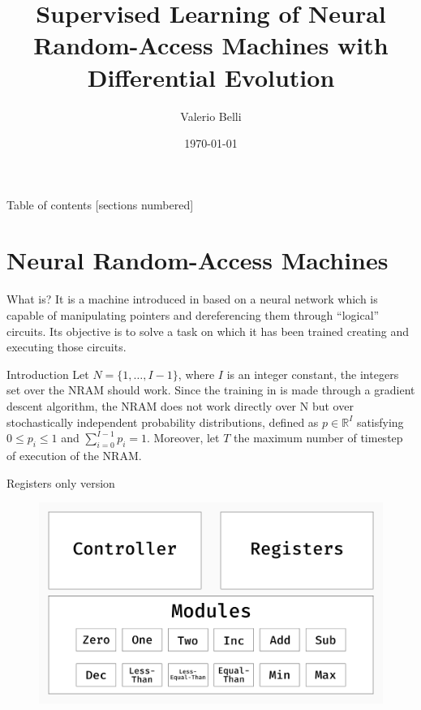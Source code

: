 \documentclass[xcolor={usenames}]{beamer}
\title{Supervised Learning of Neural Random-Access Machines with Differential Evolution}
\date{\today}
\author{Valerio Belli}
\institute{University of Perugia}
\begin{document}
  \maketitle
  
  \begin{frame}{Table of contents}
  	[sections numbered]
  	\tableofcontents[hideallsubsections]
  \end{frame}  

  
  
  \section{Neural Random-Access Machines}
  \begin{frame}{What is?}
	It is a machine introduced in \cite{NRAM:2016} based on a neural network which is capable of manipulating pointers and dereferencing them through ``logical'' circuits. Its objective is to solve a task on which it has been trained creating and executing those circuits.
  \end{frame}
  \begin{frame}{Introduction}
  	Let $N = \{ 1, \dots, I - 1 \}$, where $I$ is an integer constant, the integers set over the NRAM should work. Since the training in \cite{NRAM:2016} is made through a gradient descent algorithm, the NRAM does not work directly over N but over stochastically independent probability distributions, defined as $p \in \mathbb{R}^{I}$ satisfying $0 \leq p_i \leq 1$ and $\sum\limits_{i=0}^{I - 1} p_i = 1$. Moreover, let $T$ the maximum number of timestep of execution of the NRAM.
  \end{frame}
  \begin{frame}{Registers only version}
  	\begin{figure}
  		\centering
  		\includegraphics[width=\textwidth]{../figures/schema-nram-without-memory.png}
  	\end{figure}
  \end{frame}
\end{document}
